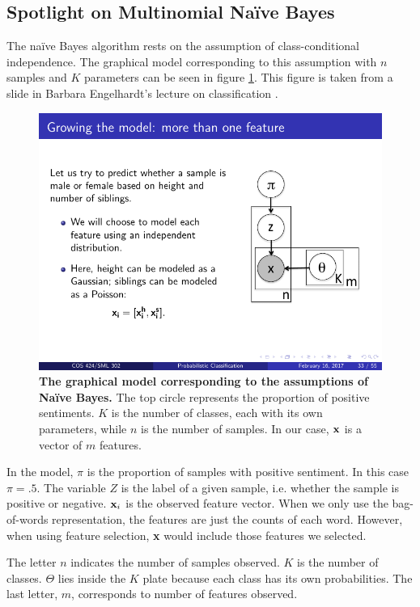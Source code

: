 \documentclass{article} %
\begin{document}
	\subsection{Spotlight on Multinomial Na\"ive Bayes} \label{subs:mnb}
	
	The na\"ive Bayes algorithm rests on the assumption of class-conditional independence. The graphical model corresponding to this assumption with $n$ samples and $K$ parameters can be seen in figure \ref{fig:dag}. This figure is taken from a slide in Barbara Engelhardt's lecture on classification \cite{engelhardt17}.
	
	\begin{figure}[h]
		\centering
		\includegraphics[scale=1]{DAG}
		\caption{{\bf The graphical model corresponding to the assumptions of Na\"ive Bayes.} The top circle represents the proportion of positive sentiments. $K$ is the number of classes, each with its own parameters, while $n$ is the number of samples. In our case, $\bf x$ is a vector of $m$ features.}
		\label{fig:dag}
	\end{figure}
	
	In the model, $\pi$ is the proportion of samples with positive sentiment. In this case $\pi = .5$. The variable $Z$ is the label of a given sample, i.e. whether the sample is positive or negative. ${\bf x}_i$ is the observed feature vector. When we only use the bag-of-words representation, the features are just the counts of each word. However, when using feature selection, {\bf x} would include those features we selected.
	
	The letter $n$ indicates the number of samples observed. $K$ is the number of classes. $\Theta$ lies inside the $K$ plate because each class has its own probabilities. The last letter, $m$, corresponds to number of features observed. 
	
\end{document}
